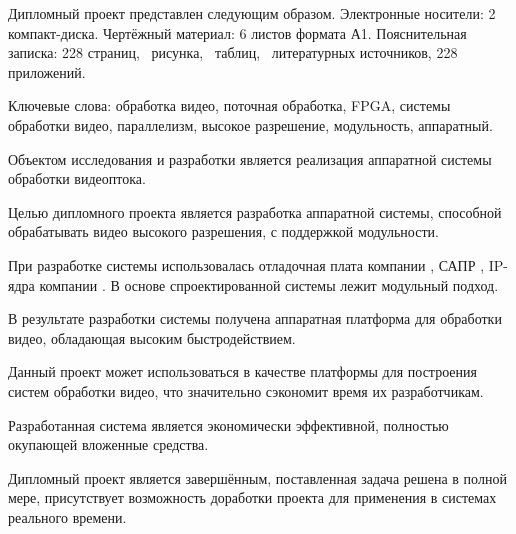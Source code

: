 \thispagestyle{empty}

Дипломный проект представлен следующим образом. Электронные носители: 2 компакт-диска.
Чертёжный материал: 6 листов формата А1. Пояснительная записка: 228 страниц, \totfig{}~рисунка,
\tottab{}~таблиц, \totref{}~литературных источников, 228 приложений.

Ключевые слова: обработка видео, поточная обработка, FPGA, системы обработки видео,
параллелизм, высокое разрешение, модульность, аппаратный.

Объектом исследования и разработки является реализация аппаратной системы обработки видеоптока.

Целью дипломного проекта является разработка аппаратной системы, способной обрабатывать видео высокого
разрешения, с поддержкой модульности.

При разработке системы использовалась отладочная плата компании , САПР ,
IP-ядра компании . В основе спроектированной системы лежит модульный подход.

В результате разработки системы получена аппаратная платформа для обработки видео, обладающая высоким
быстродействием.

Данный проект может использоваться в качестве платформы для построения систем обработки видео,
что значительно сэкономит время их разработчикам.

Разработанная система является экономически эффективной, полностью окупающей вложенные средства.

Дипломный проект является завершённым, поставленная задача решена в полной мере, присутствует возможность
доработки проекта для применения в системах реального времени.

\clearpage
